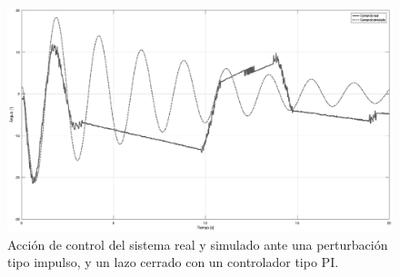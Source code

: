 %
\begin{figure}[!htbp]
    \centering
    \includegraphics[width=\linewidth]{img/pi-pert-cont.eps}
    \caption{Acción de control del sistema real y simulado ante una perturbación tipo impulso, y un lazo cerrado con un controlador tipo PI.}
    \label{fig:pi-pert-cont}
\end{figure}

